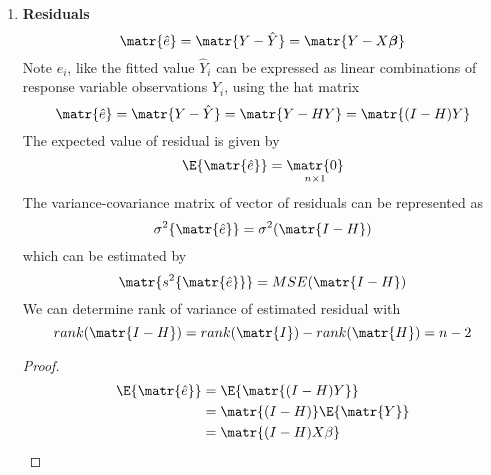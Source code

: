 \documentclass[11pt]{article}
\begin{document}
\begin{enumerate}
    \begin{enumerate}
        \item $\matr{H}$ is symmetric $\matr{H'} = H$
        \item $\matr{H}$ is idempotent $\matr{HH = H}$
    \end{enumerate}
    \begin{proof}
        \begin{align*}
            \matr{H'}
            &= (\matr{X(X'X)^{-1}X'})' \\ 
            &= \matr{X ((X'X)^{-1})'X' } \\
            &= \matr{X (X'X)^{-1}X'} \\
            &= \matr{H} \\ 
            \matr{HH} 
            &= \matr{X(X'X)^{-1}X' X(X'X)^{-1}X'}\\
            &= \matr{X(X'X)^{-1}X'} \tag{$\matr{X'X(X'X)^{-1}=I}$} \\ 
            &= \matr{X(X'X)^{-1}X'} \\
            &= \matr{H} \\ 
        \end{align*}
    \end{proof}
    \item \textbf{Residuals} 
    \[
        \matr{\hat{e}} = \matr{Y - \hat{Y}} = \matr{Y - X\boldsymbol{\beta}}
    \]
    Note $e_i$, like the fitted value $\hat{Y}_i$ can be expressed as linear combinations of response variable observations $Y_i$, using the hat matrix 
    \[
        \matr{\hat{e}} = \matr{Y - \hat{Y}} = \matr{Y - HY} = \matr{(I-H)Y}
    \]
    The expected value of residual is given by  
    \[
        \E\{\matr{\hat{e}}\} 
        = \underset{n\times 1}{\matr{0}}
    \]
    The variance-covariance matrix of vector of residuals can be represented as
    \[
        \sigma^2\{ \matr{\hat{e}} \} 
        = \sigma^2 (\matr{I-H})
    \]
    which can be estimated by 
    \[
        \matr{s^2\{ \matr{\hat{e}} \}} 
        = MSE(\matr{I-H})
    \]
    We can determine rank of variance of estimated residual with 
    \[
        rank(\matr{I-H}) = rank(\matr{I}) - rank(\matr{H}) = n - 2
    \]
    \begin{proof}
        \begin{align*}
            \E\{\matr{\hat{e}}\}
            &= \E\{ \matr{(I-H)Y} \} \\
            &= \matr{(I-H)} \E\{ \matr{Y} \} \\
            &= \matr{(I-H)X\beta} \\ 

\end{align*}
\end{proof}
\end{enumerate}
\end{document}
